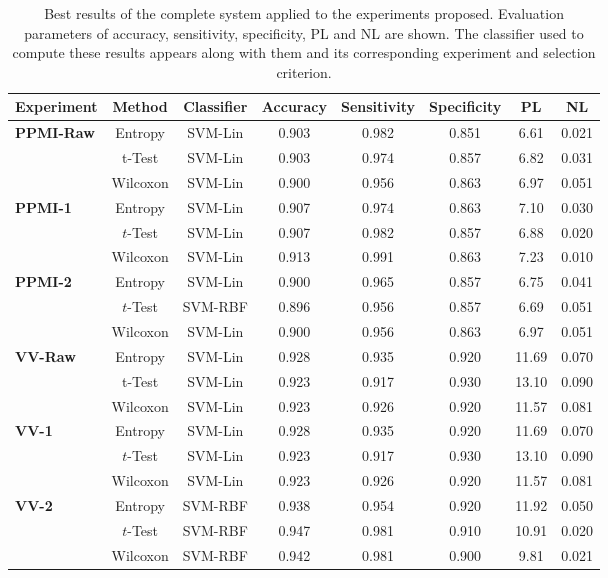 	\begin{table}[ht]
		\centering
		\begin{tabular}{lccccccc}
			Experiment 		& Method 	& Classifier	& Accuracy	& Sensitivity	& Specificity	& PL	& NL \\
			\hline \hline
			\multirow{3}{*}{\textbf{PPMI-Raw}} & Entropy & SVM-Lin & 0.903	& 0.982	& 0.851	& 6.61	& 0.021 \\ %
			&	t-Test 	& SVM-Lin & 0.903	& 0.974	& 0.857	& 6.82	& 0.031 \\ %
			&	Wilcoxon & SVM-Lin & 0.900	& 0.956	& 0.863	& 6.97	& 0.051 \\ %
			\hline
			\multirow{3}{*}{\textbf{PPMI-1}} & Entropy 	& SVM-Lin	& 0.907	& 0.974	& 0.863	& 7.10	& 0.030 \\ %
			& $t$-Test	& SVM-Lin	& 0.907	& 0.982	& 0.857	& 6.88	& 0.020 \\ %
			& Wilcoxon	& SVM-Lin	& 0.913	& 0.991	& 0.863	& 7.23	& 0.010 \\ %
			\hline
			\multirow{3}{*}{\textbf{PPMI-2}} & Entropy 	& SVM-Lin	& 0.900	& 0.965	& 0.857	& 6.75	& 0.041 \\ %
			& $t$-Test	& SVM-RBF	& 0.896	& 0.956	& 0.857	& 6.69	& 0.051 \\ %
			& Wilcoxon	& SVM-Lin	& 0.900	& 0.956	& 0.863	& 6.97	& 0.051 \\ %
			\hline \hline
			\multirow{3}{*}{\textbf{VV-Raw}} & Entropy	& SVM-Lin & 0.928	& 0.935	& 0.920	& 11.69	& 0.070 \\ %
			&	t-Test	& SVM-Lin 	& 0.923	& 0.917	& 0.930	& 13.10	& 0.090 \\ %
			&	Wilcoxon & SVM-Lin & 0.923	& 0.926	& 0.920	& 11.57	& 0.081 \\ %
			\hline
			\multirow{3}{*}{\textbf{VV-1}}	& Entropy	& SVM-Lin	& 0.928	& 0.935	& 0.920	& 11.69	& 0.070 \\ %
			& $t$-Test	& SVM-Lin	& 0.923	& 0.917	& 0.930	& 13.10	& 0.090 \\ %
			& Wilcoxon	& SVM-Lin	& 0.923	& 0.926	& 0.920	& 11.57	& 0.081 \\ %
			\hline
			\multirow{3}{*}{\textbf{VV-2}}	& Entropy	& SVM-RBF	& 0.938	& 0.954	& 0.920	& 11.92	& 0.050 \\ %
			& $t$-Test	& SVM-RBF	& 0.947	& 0.981	& 0.910	& 10.91	& 0.020 \\ %
			& Wilcoxon	& SVM-RBF	& 0.942	& 0.981	& 0.900	& 9.81	& 0.021 \\ %
			
			\hline\hline
		\end{tabular}
		\caption{Best results of the complete system applied to the experiments proposed. Evaluation parameters of accuracy, sensitivity, specificity, PL and NL are shown. The classifier used to compute these results appears along with them and its corresponding experiment and selection criterion.}
		\label{tab:detailedResults}
	\end{table}
	
